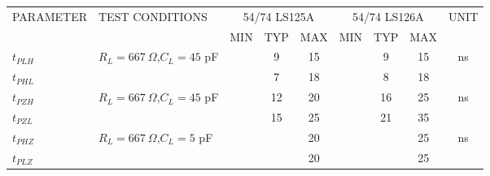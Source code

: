 \begingroup\fontsize{9}{10}\selectfont\setlength{\tabcolsep}{4pt}\renewcommand{\arraystretch}{1.0}
\begin{tabularx}{\linewidth}{|l|X|ccc|ccc|c|}\hline
\multirow{2}{*}{PARAMETER}&\multirow{2}{*}{TEST CONDITIONS}&\multicolumn{3}{c|}{54/74 LS125A}&\multicolumn{3}{c|}{54/74 LS126A}&\multirow{2}{*}{UNIT}\\\cline{3-8}
&&MIN&TYP&MAX&MIN&TYP&MAX&\\\hline
$t_{PLH}$&\multirow{2}{*}{$R_L=667\ \Omega$,\qquad $C_L=45$ pF}&&9&15&&9&15&\multirow{2}{*}{ns}\\\cline{1-1}\cline{3-8}
$t_{PHL}$&&&7&18&&8&18&\\\hline
$t_{PZH}$&\multirow{2}{*}{$R_L=667\ \Omega$,\qquad $C_L=45$ pF}&&12&20&&16&25&\multirow{2}{*}{ns}\\\cline{1-1}\cline{3-8}
$t_{PZL}$&&&15&25&&21&35&\\\hline
$t_{PHZ}$&\multirow{2}{*}{$R_L=667\ \Omega$,\qquad $C_L=5$ pF}&&&20&&&25&\multirow{2}{*}{ns}\\\cline{1-1}\cline{3-8}
$t_{PLZ}$&&&&20&&&25&\\\hline
\end{tabularx}\endgroup
